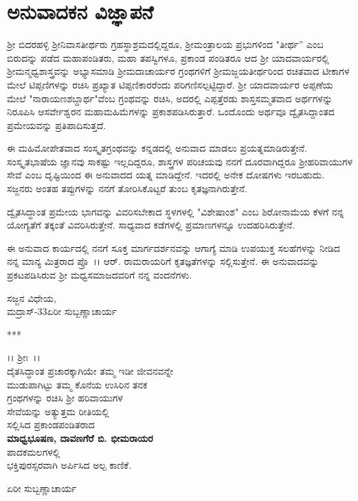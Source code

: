 
\chapter*{ಅನುವಾದಕನ ವಿಜ್ಞಾಪನೆ}

 ಶ‍್ರೀ ಬಿದರಹಳ್ಳಿ ಶ‍್ರೀನಿವಾಸತೀರ್ಥರು ಗ್ರಹಸ್ಥಾಶ್ರಮದಲ್ಲಿದ್ದರೂ, ಶ‍್ರೀಮಂತ್ರಾಲಯ ಪ್ರಭು\-ಗಳಿಂದ "ತೀರ್ಥ'' ಎಂಬ ಬಿರುದನ್ನು ಪಡೆದ ಮಹಾಪಂಡಿತರು, ಮಹಾ ತಪಸ್ವಿ\-ಗಳೂ, ಪ್ರಕಾಂಡ ಪಂಡಿತರೂ ಆದ ಶ‍್ರೀ ಯಾದವಾರ್ಯರಲ್ಲಿ ಶ‍್ರೀಮನ್ಮಧ್ವಶಾಸ್ತ್ರವನ್ನು ಅಭ್ಯಾಸ\-ಮಾಡಿ ಶ‍್ರೀಮದಾಚಾರ್ಯರ ಗ್ರಂಥಗಳಿಗೆ ಶ‍್ರೀಮಜ್ಜಯತೀರ್ಥರಿಂದ ರಚಿತವಾದ ಟೀಕಾ\-ಗಳ ಮೇಲೆ ಟಿಪ್ಪಣಿಗಳನ್ನು ರಚಿಸಿ ಪ್ರಖ್ಯಾತ ಟಿಪ್ಪಣಿಕಾರರೆಂದು ಪರಿಗಣಿಸಲ್ಪಟ್ಟಿದ್ದಾರೆ. ಶ‍್ರೀ ಯಾದವಾರ್ಯರ ಅಪ್ಪಣೆಯ ಮೇಲೆ "ನಾರಾಯಣಶಬ್ದಾರ್ಥ"ವೆಂಬ ಗ್ರಂಥವನ್ನು ರಚಿಸಿ, ಅದರಲ್ಲಿ ಎಪ್ಪತ್ತೆರಡು ಶಾಸ್ತಸಮ್ಮತವಾದ ಅರ್ಥಗಳನ್ನು ನಿರೂಪಿಸಿ ಆ\break ಸರ್ವೇಶ್ವರನ ಮಹಾಮಹಿಮೆಗಳನ್ನು ಪ್ರಕಾಶಪಡಿಸಿರುತ್ತಾರೆ. ಒಂದೊಂದು ಅರ್ಥವೂ ದ್ವೈತ\-ಸಿದ್ದಾಂತದ ಪ್ರಮೇಯವನ್ನು ಪ್ರತಿಪಾದಿಸುತ್ತದೆ.

ಈ ಮಹಿಮೋಪೇತವಾದ ಸಂಸ್ಕೃತಗ್ರಂಥವನ್ನು ಕನ್ನಡದಲ್ಲಿ ಅನುವಾದ ಮಾಡಲು ಪ್ರಯತ್ನ\-ಮಾಡಿರುತ್ತೇನೆ. ಸಂಸ್ಕೃತಭಾಷೆಯ ಜ್ಞಾನವು ಸಾಕಷ್ಟು ಇಲ್ಲದಿದ್ದರೂ, ಶಾಸ್ತ್ರಗಳ ಪರಿ\-ಚಯವು ನನಗೆ ದೂರವಾಗಿದ್ದರೂ ಶ‍್ರೀಹರಿವಾಯುಗಳ ಸೇವೆ ಎಂಬ ದೃಷ್ಟಿಯಿಂದ ಈ ಅನುವಾದದ ಯತ್ನ ಮಾಡಿದ್ದೇನೆ. ಇದರಲ್ಲಿ ಅನೇಕ ದೋಷಗಳು ಇರಬಹುದು. ಸಜ್ಜನರು ಅಂತಹ ತಪ್ಪುಗಳನ್ನು ನನಗೆ ತೋರಿಸಿಕೊಟ್ಟರೆ ತುಂಬ ಕೃತಜ್ಞನಾಗಿರುತ್ತೇನೆ.

ದ್ವೈತಸಿದ್ಧಾಂತ ಪ್ರಮೇಯ ಭಾಗವನ್ನು ವಿವರಿಸಬೇಕಾದ ಸ್ಥಳಗಳಲ್ಲಿ "ವಿಶೇಷಾಂಶ" ಎಂಬ ಶಿರೋನಾಮೆಯ ಕೆಳಗೆ ನನ್ನ ಯೋಗ್ಯತೆಗೆ ತಕ್ಕಂತೆ ವಿವರಿಸಿರುತ್ತೇನೆ. ಸಾಧ್ಯವಾದ ಕಡೆ\-ಗಳಲ್ಲಿ ಪ್ರಮಾಣಗಳನ್ನೂ ಉದಹರಿಸಿರುತ್ತೇನೆ.

\newpage

ಈ ಅನುವಾದ ಕಾರ್ಯದಲ್ಲಿ ನನಗೆ ಸೂಕ್ತ ಮಾರ್ಗದರ್ಶನವನ್ನು ಆಗಾಗ್ಯೆ ಮಾಡಿ ಉಪಯುಕ್ತ ಸಲಹೆಗಳನ್ನು ನೀಡಿದ ನನ್ನ ಮಾನ್ಯ ಮಿತ್ರರಾದ ಪ್ರೊ~।। ಆರ್. ರಾಮರಾಯರಿಗೆ ಕೃತ\-ಜ್ಞತೆಗಳನ್ನು ಸಲ್ಲಿಸುತ್ತೇನೆ. ಈ ಅನುವಾದವನ್ನು ಪ್ರಕಟಪಡಿಸಿರುವ ಶ‍್ರೀ ಮಧ್ವಸಮಾಜ\-ದವರಿಗೆ ನನ್ನ ವಂದನೆಗಳು.

\vskip 1cm

\begin{flushleft}
\hfill ಸಜ್ಜನ ವಿಧೇಯ,\\ಮದ್ರಾಸ್-33\hfill ಏರೀ ಸುಬ್ಬಣ್ಣಾಚಾರ್ಯ
\end{flushleft}

\begin{center}
***
\end{center}

\newpage

\phantom{}

\vfill

\begin{center}
।। ಶ‍್ರೀಃ~।।\\ ದೈತಸಿದ್ಧಾಂತ ಪ್ರಚಾರಕ್ಕಾಗಿಯೇ ತಮ್ಮ ಇಡೀ ಜೀವನವನ್ನೇ\\ ಮುಡುಪಾಗಿಟ್ಟು ತಮ್ಮ ಕೊನೆಯ ಉಸಿರಿನ ತನಕ\\ ಗ್ರಂಥಗಳನ್ನು ರಚಿಸಿ ಶ‍್ರೀ ಹರಿವಾಯುಗಳ\\ ಸೇವೆಯನ್ನು ಅತ್ಯುತ್ತಮ ರೀತಿಯಲ್ಲಿ\\ ಸಲ್ಲಿಸಿದ ಪ್ರಕಾಂಡಪಂಡಿತರಾದ\\\textbf{ಮಾಧ್ವಭೂಷಣ, ದಾವಣಗೆರೆ ಬಿ. ಭೀಮರಾಯರ}\\ ಪಾದಕಮಲಗಳಲ್ಲಿ\\ ಭಕ್ತಿಪುರಸ್ಸರವಾಗಿ ಅರ್ಪಿಸಿದ ಅಲ್ಪ ಕಾಣಿಕೆ.
\end{center}

\begin{flushright}
ಏರೀ ಸುಬ್ಬಣ್ಣಾಚಾರ್ಯ
\end{flushright}

